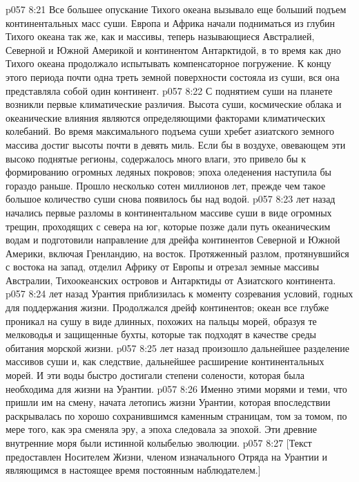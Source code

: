 \vs p057 8:21 Все большее опускание Тихого океана вызывало еще больший подъем континентальных масс суши. Европа и Африка начали подниматься из глубин Тихого океана так же, как и массивы, теперь называющиеся Австралией, Северной и Южной Америкой и континентом Антарктидой, в то время как дно Тихого океана продолжало испытывать компенсаторное погружение. К концу этого периода почти одна треть земной поверхности состояла из суши, вся она представляла собой один континент.
\vs p057 8:22 С поднятием суши на планете возникли первые климатические различия. Высота суши, космические облака и океанические влияния являются определяющими факторами климатических колебаний. Во время максимального подъема суши хребет азиатского земного массива достиг высоты почти в девять миль. Если бы в воздухе, овевающем эти высоко поднятые регионы, содержалось много влаги, это привело бы к формированию огромных ледяных покровов; эпоха оледенения наступила бы гораздо раньше. Прошло несколько сотен миллионов лет, прежде чем такое большое количество суши снова появилось бы над водой.
\vs p057 8:23 \pc {} лет назад начались первые разломы в континентальном массиве суши в виде огромных трещин, проходящих с севера на юг, которые позже дали путь океаническим водам и подготовили направление для дрейфа континентов Северной и Южной Америки, включая Гренландию, на восток. Протяженный разлом, протянувшийся с востока на запад, отделил Африку от Европы и отрезал земные массивы Австралии, Тихоокеанских островов и Антарктиды от Азиатского континента.
\vs p057 8:24 \pc {} лет назад Урантия приблизилась к моменту созревания условий, годных для поддержания жизни. Продолжался дрейф континентов; океан все глубже проникал на сушу в виде длинных, похожих на пальцы морей, образуя те мелководья и защищенные бухты, которые так подходят в качестве среды обитания морской жизни.
\vs p057 8:25 \pc {} лет назад произошло дальнейшее разделение массивов суши и, как следствие, дальнейшее расширение континентальных морей. И эти воды быстро достигали степени солености, которая была необходима для жизни на Урантии.
\vs p057 8:26 Именно этими морями и теми, что пришли им на смену, начата летопись жизни Урантии, которая впоследствии раскрывалась по хорошо сохранившимся каменным страницам, том за томом, по мере того, как эра сменяла эру, а эпоха следовала за эпохой. Эти древние внутренние моря были истинной колыбелью эволюции.
\vsetoff
\vs p057 8:27 [Текст предоставлен Носителем Жизни, членом изначального Отряда на Урантии и являющимся в настоящее время постоянным наблюдателем.]
